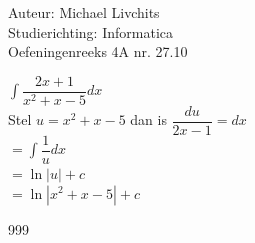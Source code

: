 \documentclass[a4paper]{article}
\begin{document}
  
\noindent \large Auteur: Michael Livchits \\
\noindent \large Studierichting:  Informatica\\
\noindent \large Oefeningenreeks 4A nr. 27.10\\

\medskip

\normalsize

$ \displaystyle\int\dfrac{2x+1}{x^2+x-5}dx$\\

Stel $u=x^2+x-5$ dan is $\dfrac{du}{2x-1} = dx$\\

$ = \displaystyle\int\dfrac{1}{u}dx$\\

$ = \ln|u|+c$\\

$ = \ln|x^2+x-5| + c $\\

\begin{thebibliography}{999}
\end{thebibliography}
\end{document}
